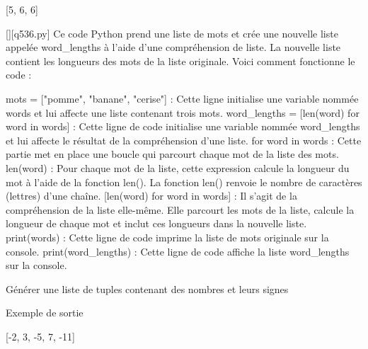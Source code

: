 [5, 6, 6]
        \par
        \begin{solution}
            \renewcommand{\nomfichier}{q536.py}
            \pythonfile{\chemincode \nomfichier}[][\nomfichier]
            Ce code Python prend une liste de mots et crée une nouvelle liste appelée word_lengths à l'aide d'une compréhension de liste. La nouvelle liste contient les longueurs des mots de la liste originale. Voici comment fonctionne le code :

    mots = ["pomme", "banane", "cerise"] : Cette ligne initialise une variable nommée words et lui affecte une liste contenant trois mots.
    word_lengths = [len(word) for word in words] : Cette ligne de code initialise une variable nommée word_lengths et lui affecte le résultat de la compréhension d'une liste.
        for word in words : Cette partie met en place une boucle qui parcourt chaque mot de la liste des mots.
        len(word) : Pour chaque mot de la liste, cette expression calcule la longueur du mot à l'aide de la fonction len(). La fonction len() renvoie le nombre de caractères (lettres) d'une chaîne.
        [len(word) for word in words] : Il s'agit de la compréhension de la liste elle-même. Elle parcourt les mots de la liste, calcule la longueur de chaque mot et inclut ces longueurs dans la nouvelle liste.
    print(words) : Cette ligne de code imprime la liste de mots originale sur la console.
    print(word_lengths) : Cette ligne de code affiche la liste word_lengths sur la console.
        \end{solution}
        

        \question
        Générer une liste de tuples contenant des nombres et leurs signes

Exemple de sortie

[-2, 3, -5, 7, -11]

